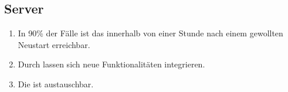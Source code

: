 \subsection{Server}

\begin{enumerate}
    \item In 90\% der Fälle ist das %
        innerhalb von einer Stunde nach einem gewollten Neustart erreichbar.
    \item Durch %
        lassen sich neue Funktionalitäten integrieren.
    \item Die %
        ist austauschbar.
\end{enumerate}